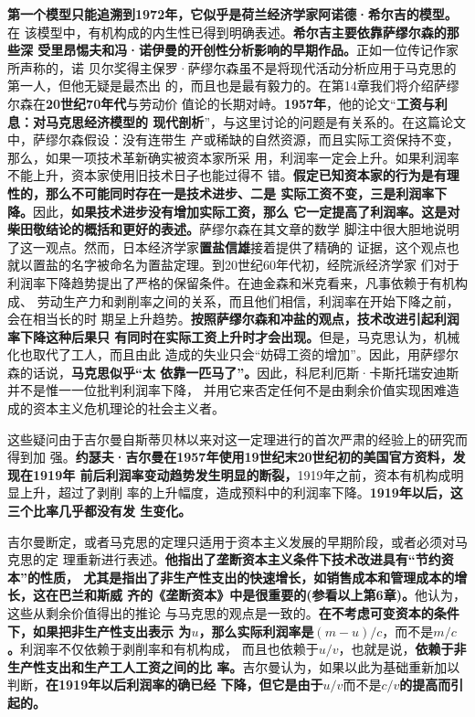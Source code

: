 \textbf{第一个模型只能追溯到1972年，它似乎是荷兰经济学家阿诺德·希尔吉的模型。}在
该模型中，有机构成的内生性已得到明确表述。\textbf{希尔吉主要依靠萨缪尔森的那些深
  受里昂惕夫和冯·诺伊曼的开创性分析影响的早期作品。}正如一位传记作家所声称的，诺
贝尔奖得主保罗·萨缪尔森虽不是将现代活动分析应用于马克思的第一人，但他无疑是最杰出
的，而且也是最有毅力的。在第14章我们将介绍萨缪尔森在\textbf{20世纪70年代}与劳动价
值论的长期对峙。\textbf{1957年}，他的论文“\textbf{工资与利息：对马克思经济模型的
  现代剖析}”，与这里讨论的问题是有关系的。在这篇论文中，萨缪尔森假设：没有连带生
产或稀缺的自然资源，而且实际工资保持不变，那么，如果一项技术革新确实被资本家所采
用，利润率一定会上升。如果利润率不能上升，资本家使用旧技术日子也能过得不
错。\textbf{假定已知资本家的行为是有理性的，那么不可能同时存在一是技术进步、二是
  实际工资不变，三是利润率下降。}因此，\textbf{如果技术进步没有增加实际工资，那么
  它一定提高了利润率。这是对柴田敬结论的概括和更好的表述。}萨缪尔森在其文章的数学
脚注中很大胆地说明了这一观点。然而，日本经济学家\textbf{置盐信雄}接着提供了精确的
证据，这个观点也就以置盐的名字被命名为置盐定理。到20世纪60年代初，经院派经济学家
们对于利润率下降趋势提出了严格的保留条件。在迪金森和米克看来，凡事依赖于有机构成、
劳动生产力和剥削率之间的关系，而且他们相信，利润率在开始下降之前，会在相当长的时
期呈上升趋势。\textbf{按照萨缪尔森和冲盐的观点，技术改进引起利润率下降这种后果只
  有同时在实际工资上升时才会出现。}但是，马克思认为，机械化也取代了工人，而且由此
造成的失业只会“妨碍工资的增加”。因此，用萨缪尔森的话说，\textbf{马克思似乎“太
  依靠一匹马了”。}因此，科尼利厄斯·卡斯托瑞安迪斯并不是惟一一位批判利润率下降，
并用它来否定任何不是由剩余价值实现困难造成的资本主义危机理论的社会主义者。

这些疑问由于吉尔曼自斯蒂贝林以来对这一定理进行的首次严肃的经验上的研究而得到加
强。\textbf{约瑟夫·吉尔曼在1957年使用19世纪末20世纪初的美国官方资料，发现在1919年
  前后利润率变动趋势发生明显的断裂，}1919年之前，资本有机构成明显上升，超过了剥削
率的上升幅度，造成预料中的利润率下降。\textbf{1919年以后，这三个比率几乎都没有发
  生变化。}

吉尔曼断定，或者马克思的定理只适用于资本主义发展的早期阶段，或者必须对马克思的定
理重新进行表述。\textbf{他指出了垄断资本主义条件下技术改进具有“节约资本”的性质，
  尤其是指出了非生产性支出的快速增长，如销售成本和管理成本的增长，这在巴兰和斯威
  齐的《垄断资本》中是很重要的(参看以上第6章)。}他认为，这些从剩余价值得出的推论
与马克思的观点是一致的。\textbf{在不考虑可变资本的条件下，如果把非生产性支出表示
  为$u$，那么实际利润率是$(m-u)/c，而不是m/c$。}利润率不仅依赖于剥削率和有机构成，
而且也依赖于$u/v$，也就是说，\textbf{依赖于非生产性支出和生产工人工资之间的比
  率。}吉尔曼认为，如果以此为基础重新加以判断，\textbf{在1919年以后利润率的确已经
  下降，但它是由于$u/v而不是c/v$的提高而引起的。}

